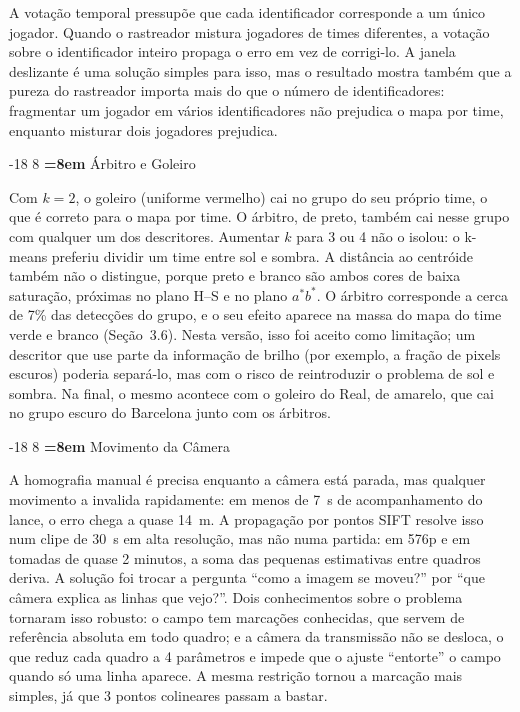 \documentclass[12pt]{article}
\makeatletter
\renewcommand\subsection{\@startsection{subsection}{2}{\z@}%
                       {-18\p@ \@plus -4\p@ \@minus -4\p@}%
                       {8\p@ \@plus 4\p@ \@minus 4\p@}%
                       {\normalfont\normalsize\bfseries\boldmath
                        \rightskip=\z@ \@plus 8em\pretolerance=10000 }}
\makeatother
\begin{document}
A votação temporal pressupõe que cada identificador corresponde a um único jogador.
Quando o rastreador mistura jogadores de times diferentes, a votação sobre o
identificador inteiro propaga o erro em vez de corrigi-lo. A janela deslizante é uma
solução simples para isso, mas o resultado mostra também que a pureza do rastreador
importa mais do que o número de identificadores: fragmentar um jogador em vários
identificadores não prejudica o mapa por time, enquanto misturar dois jogadores
prejudica.

\subsection{Árbitro e Goleiro}

Com $k=2$, o goleiro (uniforme vermelho) cai no grupo do seu próprio time, o que é
correto para o mapa por time. O árbitro, de preto, também cai nesse grupo com
qualquer um dos descritores. Aumentar $k$ para 3 ou 4 não o isolou: o k-means
preferiu dividir um time entre sol e sombra. A distância ao centróide também não o
distingue, porque preto e branco são ambos cores de baixa saturação, próximas no
plano H--S e no plano $a^*b^*$. O árbitro corresponde a cerca de 7\% das detecções do
grupo, e o seu efeito aparece na massa do mapa do time verde e branco
(Seção~3.6). Nesta versão, isso foi aceito como limitação; um descritor que use parte
da informação de brilho (por exemplo, a fração de pixels escuros) poderia separá-lo,
mas com o risco de reintroduzir o problema de sol e sombra. Na final, o mesmo
acontece com o goleiro do Real, de amarelo, que cai no grupo escuro do Barcelona
junto com os árbitros.

\subsection{Movimento da Câmera}

A homografia manual é precisa enquanto a câmera está parada, mas qualquer movimento
a invalida rapidamente: em menos de 7~s de acompanhamento do lance, o erro chega a
quase 14~m. A propagação por pontos SIFT resolve isso num clipe de 30~s em alta
resolução, mas não numa partida: em 576p e em tomadas de quase 2 minutos, a soma
das pequenas estimativas entre quadros deriva. A solução foi trocar a pergunta
``como a imagem se moveu?'' por ``que câmera explica as linhas que vejo?''. Dois
conhecimentos sobre o problema tornaram isso robusto: o campo tem marcações
conhecidas, que servem de referência absoluta em todo quadro; e a câmera da
transmissão não se desloca, o que reduz cada quadro a 4 parâmetros e impede que o
ajuste ``entorte'' o campo quando só uma linha aparece. A mesma restrição tornou a
marcação mais simples, já que 3 pontos colineares passam a bastar.
\end{document}
